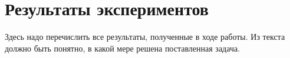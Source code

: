 \section{Результаты экспериментов}
\label{sec:Chapter5} 

Здесь надо перечислить все результаты, полученные в ходе работы. Из текста
должно быть понятно, в какой мере решена поставленная задача.

\newpage
